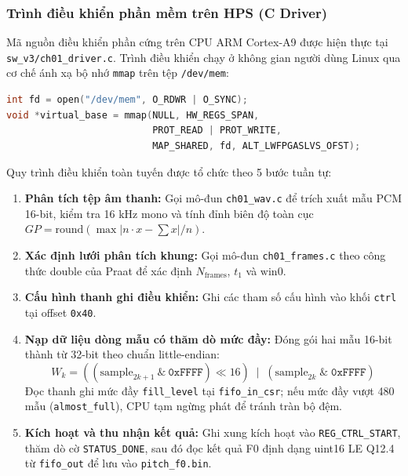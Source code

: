 \subsubsection*{Trình điều khiển phần mềm trên HPS (C Driver)}
Mã nguồn điều khiển phần cứng trên CPU ARM Cortex-A9 được hiện thực tại \texttt{sw\_v3/ch01\_driver.c}. Trình điều khiển chạy ở không gian người dùng Linux qua cơ chế ánh xạ bộ nhớ \texttt{mmap} trên tệp \texttt{/dev/mem}:
\begin{lstlisting}[language=C, basicstyle=\small\ttfamily, frame=single]
int fd = open("/dev/mem", O_RDWR | O_SYNC);
void *virtual_base = mmap(NULL, HW_REGS_SPAN, 
                          PROT_READ | PROT_WRITE, 
                          MAP_SHARED, fd, ALT_LWFPGASLVS_OFST);
\end{lstlisting}

Quy trình điều khiển toàn tuyến được tổ chức theo 5 bước tuần tự:
\begin{enumerate}[leftmargin=1.5em, itemsep=3pt]
    \item \textbf{Phân tích tệp âm thanh:} Gọi mô-đun \texttt{ch01\_wav.c} để trích xuất mẫu PCM 16-bit, kiểm tra 16 kHz mono và tính đỉnh biên độ toàn cục $GP = \text{round}(\max |n \cdot x - \sum x| / n)$.
    \item \textbf{Xác định lưới phân tích khung:} Gọi mô-đun \texttt{ch01\_frames.c} theo công thức double của Praat để xác định $N_{\text{frames}}$, $t_1$ và $\text{win0}$.
    \item \textbf{Cấu hình thanh ghi điều khiển:} Ghi các tham số cấu hình vào khối \texttt{ctrl} tại offset \texttt{0x40}.
    \item \textbf{Nạp dữ liệu dòng mẫu có thăm dò mức đầy:} Đóng gói hai mẫu 16-bit thành từ 32-bit theo chuẩn little-endian:
    \begin{equation}
    W_k = ((\text{sample}_{2k+1} \ \& \ \mathtt{0xFFFF}) \ll 16) \;\mid\; (\text{sample}_{2k} \;\mathbin{\&}\; \mathtt{0xFFFF})
    \end{equation}
    Đọc thanh ghi mức đầy \texttt{fill\_level} tại \texttt{fifo\_in\_csr}; nếu mức đầy vượt 480 mẫu (\texttt{almost\_full}), CPU tạm ngừng phát để tránh tràn bộ đệm.
    \item \textbf{Kích hoạt và thu nhận kết quả:} Ghi xung kích hoạt vào \texttt{REG\_CTRL\_START}, thăm dò cờ \texttt{STATUS\_DONE}, sau đó đọc kết quả F0 định dạng uint16 LE Q12.4 từ \texttt{fifo\_out} để lưu vào \texttt{pitch\_f0.bin}.
\end{enumerate}

